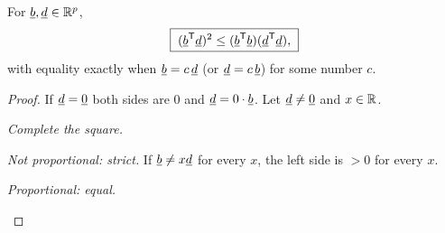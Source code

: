 \begin{theorem}
For $\underline{b},\underline{d}\in\mathbb{R}^p$,
\[
  \boxed{\;(\underline{b}^{\mathsf{T}}\underline{d})^2\le(\underline{b}^{\mathsf{T}}\underline{b})(\underline{d}^{\mathsf{T}}\underline{d}),\;}
\]
with equality exactly when $\underline{b}=c\,\underline{d}$ (or $\underline{d}=c\,\underline{b}$) for some number $c$.
\end{theorem}
\begin{proof}
If $\underline{d}=\underline{0}$ both sides are $0$ and $\underline{d}=0\cdot\underline{b}$. Let $\underline{d}\ne\underline{0}$ and $x\in\mathbb{R}$.
\begin{steps}
  \item \emph{Complete the square.}
  \begin{deriv}
  \end{deriv}
  \item \emph{Not proportional: strict.} If $\underline{b}\ne x\underline{d}$ for every $x$, the left side is $>0$ for every $x$.
  \begin{deriv}
  \end{deriv}
  \item \emph{Proportional: equal.}
  \begin{deriv}
  \end{deriv}
\end{steps}
\end{proof}

